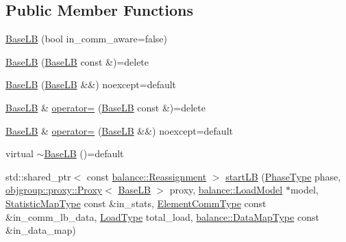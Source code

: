 \subsection*{Public Member Functions}
\begin{DoxyCompactItemize}
\item 
\hyperlink{structvt_1_1vrt_1_1collection_1_1lb_1_1_base_l_b_a96ad04c03781fc057dbfb9049f67530f}{Base\+LB} (bool in\+\_\+comm\+\_\+aware=false)
\item 
\hyperlink{structvt_1_1vrt_1_1collection_1_1lb_1_1_base_l_b_af34c68c8ecf1341189a67c3405036d16}{Base\+LB} (\hyperlink{structvt_1_1vrt_1_1collection_1_1lb_1_1_base_l_b}{Base\+LB} const \&)=delete
\item 
\hyperlink{structvt_1_1vrt_1_1collection_1_1lb_1_1_base_l_b_a1d1ae8a311e14e27b26624caee930535}{Base\+LB} (\hyperlink{structvt_1_1vrt_1_1collection_1_1lb_1_1_base_l_b}{Base\+LB} \&\&) noexcept=default
\item 
\hyperlink{structvt_1_1vrt_1_1collection_1_1lb_1_1_base_l_b}{Base\+LB} \& \hyperlink{structvt_1_1vrt_1_1collection_1_1lb_1_1_base_l_b_a94be0abcbc47bf6a3f3685f94dd5d4cb}{operator=} (\hyperlink{structvt_1_1vrt_1_1collection_1_1lb_1_1_base_l_b}{Base\+LB} const \&)=delete
\item 
\hyperlink{structvt_1_1vrt_1_1collection_1_1lb_1_1_base_l_b}{Base\+LB} \& \hyperlink{structvt_1_1vrt_1_1collection_1_1lb_1_1_base_l_b_a1e092a34c8e4eda0a05ab3a2f5a9ae45}{operator=} (\hyperlink{structvt_1_1vrt_1_1collection_1_1lb_1_1_base_l_b}{Base\+LB} \&\&) noexcept=default
\item 
virtual \hyperlink{structvt_1_1vrt_1_1collection_1_1lb_1_1_base_l_b_a2d4e31b7ae227886a24443334114269e}{$\sim$\+Base\+LB} ()=default
\item 
std\+::shared\+\_\+ptr$<$ const \hyperlink{structvt_1_1vrt_1_1collection_1_1balance_1_1_reassignment}{balance\+::\+Reassignment} $>$ \hyperlink{structvt_1_1vrt_1_1collection_1_1lb_1_1_base_l_b_a17e2cdb89806df4fbdcd579fa015f816}{start\+LB} (\hyperlink{namespacevt_a46ce6733d5cdbd735d561b7b4029f6d7}{Phase\+Type} phase, \hyperlink{structvt_1_1objgroup_1_1proxy_1_1_proxy}{objgroup\+::proxy\+::\+Proxy}$<$ \hyperlink{structvt_1_1vrt_1_1collection_1_1lb_1_1_base_l_b}{Base\+LB} $>$ proxy, \hyperlink{structvt_1_1vrt_1_1collection_1_1balance_1_1_load_model}{balance\+::\+Load\+Model} $\ast$model, \hyperlink{structvt_1_1vrt_1_1collection_1_1lb_1_1_base_l_b_acd9bdad961ac83c96b7a227de672f96c}{Statistic\+Map\+Type} const \&in\+\_\+stats, \hyperlink{structvt_1_1vrt_1_1collection_1_1lb_1_1_base_l_b_a83eb4daec14edfb8780422e95b8e38d3}{Element\+Comm\+Type} const \&in\+\_\+comm\+\_\+lb\+\_\+data, \hyperlink{namespacevt_a8fb51741340b87d7aaee0bef60e9896b}{Load\+Type} total\+\_\+load, \hyperlink{namespacevt_1_1vrt_1_1collection_1_1balance_a5794b6bc763c88c78228074bd0d1a50f}{balance\+::\+Data\+Map\+Type} const \&in\+\_\+data\+\_\+map)

\end{DoxyCompactItemize}
